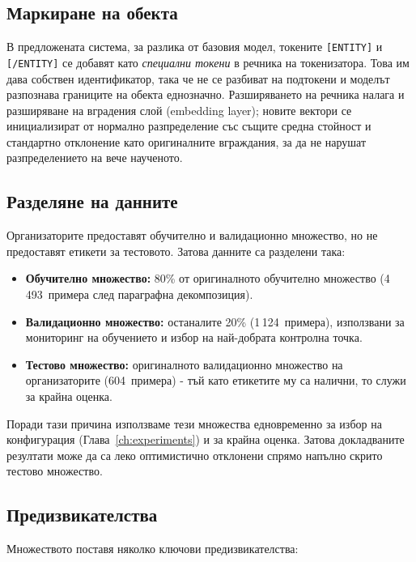 \documentclass[12pt,a4paper]{report}
\begin{document}
\subsection{Маркиране на обекта}

В предложената система, за разлика от базовия модел, токените \texttt{[ENTITY]} и \texttt{[/ENTITY]} се добавят като \textit{специални токени} в речника на токенизатора. Това им дава собствен идентификатор, така че не се разбиват на подтокени и моделът разпознава границите на обекта еднозначно. Разширяването на речника налага и разширяване на вградения слой (embedding layer); новите вектори се инициализират от нормално разпределение със същите средна стойност и стандартно отклонение като оригиналните вграждания, за да не нарушат разпределението на вече наученото.

\subsection{Разделяне на данните}

Организаторите предоставят обучително и валидационно множество, но не предоставят етикети за тестовото. Затова данните са разделени така:
\begin{itemize}
  \item \textbf{Обучително множество:} 80\% от оригиналното обучително множество (4\,493~примера след параграфна декомпозиция).
  \item \textbf{Валидационно множество:} останалите 20\% (1\,124~примера), използвани за мониторинг на обучението и избор на най-добрата контролна точка.
  \item \textbf{Тестово множество:} оригиналното валидационно множество на организаторите (604~примера) - тъй като етикетите му са налични, то служи за крайна оценка.
\end{itemize}

Поради тази причина използваме тези множества едновременно за избор на конфигурация (Глава~\ref{ch:experiments}) и за крайна оценка. Затова докладваните резултати може да са леко оптимистично отклонени спрямо напълно скрито тестово множество.


\subsection{Предизвикателства}

Множеството поставя няколко ключови предизвикателства:
\end{document}
